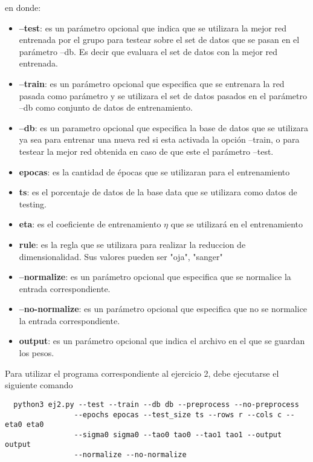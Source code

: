 en donde:
\begin{itemize}
  \item \textbf{--test}: es un parámetro opcional que indica que se utilizara la mejor red entrenada por el grupo para testear sobre el set de datos que se pasan en el parámetro
  --db. Es decir que evaluara el set de datos con la mejor red entrenada.
  \item \textbf{--train}: es un parámetro opcional que especifica que se entrenara la red pasada como parámetro y se utilizara el set de datos pasados en el parámetro --db
  como conjunto de datos de entrenamiento.
  \item \textbf{--db}: es un parametro opcional que especifica la base de datos que se utilizara ya sea para entrenar una nueva red si esta activada la opción --train, o
  para testear la mejor red obtenida en caso de que este el parámetro --test.
  \item \textbf{epocas}: es la cantidad de épocas que se utilizaran para el entrenamiento
  \item \textbf{ts}: es el porcentaje de datos de la base data que se utilizara como datos de testing.
  \item \textbf{eta}: es el coeficiente de entrenamiento $\eta$ que se utilizará en el entrenamiento
  \item \textbf{rule}: es la regla que se utilizara para realizar la reduccion de dimensionalidad. Sus valores pueden ser {"oja", "sanger"}
  \item \textbf{--normalize}: es un parámetro opcional que especifica que se normalice la entrada correspondiente.
  \item \textbf{--no-normalize}: es un parámetro opcional que especifica que no se normalice la entrada correspondiente.
  \item \textbf{output}: es un parámetro opcional que indica el archivo en el que se guardan los pesos.
\end{itemize}

Para utilizar el programa correspondiente al ejercicio 2, debe ejecutarse el siguiente comando
\begin{verbatim}
  python3 ej2.py --test --train --db db --preprocess --no-preprocess
                --epochs epocas --test_size ts --rows r --cols c --eta0 eta0
                --sigma0 sigma0 --tao0 tao0 --tao1 tao1 --output output
                --normalize --no-normalize
\end{verbatim}

